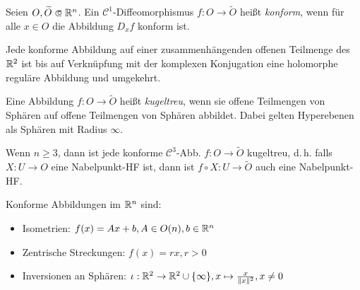 \documentclass{cheat-sheet}
\begin{document}
\begin{defn}
  Seien $O, \widetilde{O} \opn \R^n$. Ein $\mathcal{C}^1$-Diffeomorphismus $f : O \to \widetilde{O}$ heißt \emph{konform}, wenn für alle $x \in O$ die Abbildung $D_x f$ konform ist.
\end{defn}

\iffalse
\begin{bem}[Konforme Abbildungen im $\R^2$]
  Sei $O \opn \C \cong \R^2$ zusammenhängend und $f : O \to \widetilde{O}$ konform.
  Sei $\lambda : O \to \R_{> 0}$ der konforme Faktor, d.\,h. $\lambda(x)^{-1} D_x f \in O(n)$.
  Ohne Einschränkung ist $\det(D_x f) > 0$ für alle $x \in O$ (sonst $\widetilde{f} = f \circ \overline{\,\cdot\,}$).
  Es folgt: $D_x f = \lambda(x) \begin{psmallmatrix} \cos \alpha_x & \sin \alpha_x \\ -\sin \alpha_x & \cos \alpha_x \end{psmallmatrix} = \lambda(x) \cdot e^{i \alpha_x} \in \C$, also ist $f$ holomorph.
\end{bem}
\fi

\begin{satz}
  Jede konforme Abbildung auf einer zusammenhängenden offenen Teilmenge des $\R^2$ ist bis auf Verknüpfung mit der komplexen Konjugation eine holomorphe reguläre Abbildung und umgekehrt.
\end{satz}

\begin{defn}
  Eine Abbildung $f : O \to \widetilde{O}$ heißt \emph{kugeltreu}, wenn sie offene Teilmengen von Sphären auf offene Teilmengen von Sphären abbildet. Dabei gelten Hyperebenen als Sphären mit Radius $\infty$.
\end{defn}

\begin{satz}[Liouville]
  Wenn $n \geq 3$, dann ist jede konforme $\mathcal{C}^3$-Abb. $f : O \to \widetilde{O}$ kugeltreu, d.\,h. falls $X : U \to O$ eine Nabelpunkt-HF ist, dann ist $f \circ X : U \to \widetilde{O}$ auch eine Nabelpunkt-HF.
\end{satz}



\begin{bsp} Konforme Abbildungen im $\mathbb{R}^n$ sind:
  \begin{itemize}
    \item Isometrien: $f(x) = Ax + b, A \in O(n), b \in \mathbb{R}^n$
    \item Zentrische Streckungen: $f(x) = rx, r > 0$
    \item Inversionen an Sphären: $\iota : \mathbb{R}^2 \to \mathbb{R}^2 \cup \{ \infty \}, x \mapsto \tfrac{x}{\lVert x\rVert^2}, x \not= 0$
  \end{itemize}
\end{bsp}
\end{document}
